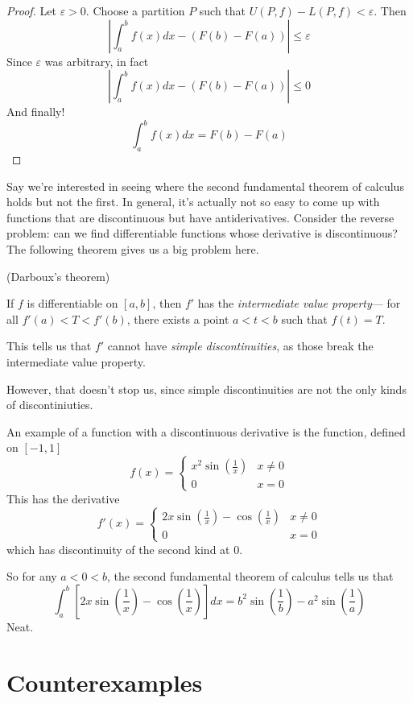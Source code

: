 \documentclass{article}
\begin{document}
\begin{proof}
    Let $\varepsilon > 0$. Choose a partition $P$ such that $U(P, f) - L(P,f) < \varepsilon$. Then
    \[
        \left|\int_a^b f(x)dx - (F(b)-F(a))\right| \leq \varepsilon
    \]
    Since $\varepsilon$ was arbitrary, in fact
    \[
        \left|\int_a^b f(x)dx - (F(b)-F(a))\right| \leq 0
    \]
    And finally!
    \[
        \int_a^b f(x)dx = F(b) - F(a)
    \]
\end{proof}

Say we're interested in seeing where the second fundamental theorem of calculus holds but not the first. In general, it's actually not so easy to come up with functions that are discontinuous but have antiderivatives. Consider the reverse problem: can we find differentiable functions whose derivative is discontinuous? The following theorem gives us a big problem here. 

\begin{theorem} (Darboux's theorem)

    If $f$ is differentiable on $[a, b]$, then $f'$ has the \textit{intermediate value property}--- for all $f'(a) < T < f'(b)$, there exists a point $a < t < b$ such that $f(t) = T$.
\end{theorem}

This tells us that $f'$ cannot have \textit{simple discontinuities}, as those break the intermediate value property.

However, that doesn't stop us, since simple discontinuities are not the only kinds of discontiniuties.

An example of a function with a discontinuous derivative is the function, defined on $[-1, 1]$
\[
    f(x) = \begin{cases}
        x^2\sin\left(\frac{1}{x}\right) & x \neq 0 \\
        0 & x = 0
    \end{cases}
\]
This has the derivative
\[
    f'(x) = \begin{cases}
    2x\sin\left(\frac{1}{x}\right) - \cos\left(\frac{1}{x}\right) & x \neq 0 \\
    0 & x = 0
    \end{cases}
\]
which has discontinuity of the second kind at $0$.

So for any $a < 0 < b$, the second fundamental theorem of calculus tells us that
\[
    \int_a^b \left[2x\sin\left(\frac{1}{x}\right) - \cos\left(\frac{1}{x}\right)\right]dx = b^2\sin\left(\frac{1}{b}\right) - a^2\sin\left(\frac{1}{a}\right)
\]
Neat.

\section{Counterexamples}
\end{document}
